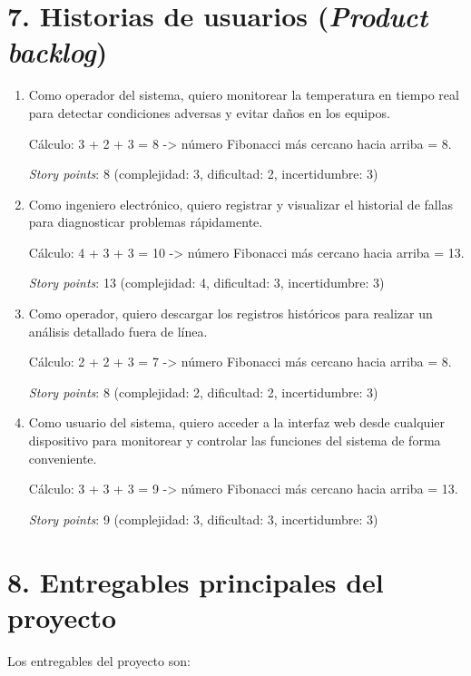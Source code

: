 \documentclass[
11pt, %
]{charter}
\begin{document}
\section{7. Historias de usuarios (\textit{Product backlog})}
\label{sec:backlog}

\begin{enumerate}
	\item Como operador del sistema, quiero monitorear la temperatura en tiempo real para detectar condiciones adversas y evitar daños en los equipos.
	
Cálculo: 3 + 2 + 3 = 8 -> número Fibonacci más cercano hacia arriba = 8. 
	
	\textit{Story points}: 8 (complejidad: 3, dificultad: 2, incertidumbre: 3)
	
	\item Como ingeniero electrónico, quiero registrar y visualizar el historial de fallas para diagnosticar problemas rápidamente.
	
Cálculo: 4 + 3 + 3 = 10 -> número Fibonacci más cercano hacia arriba = 13. 
	
	\textit{Story points}: 13 (complejidad: 4, dificultad: 3, incertidumbre: 3)
	
	\item Como operador, quiero descargar los registros históricos para realizar un análisis detallado fuera de línea.

Cálculo: 2 + 2 + 3 = 7 -> número Fibonacci más cercano hacia arriba = 8. 
	
	\textit{Story points}: 8 (complejidad: 2, dificultad: 2, incertidumbre: 3)
	
	\item Como usuario del sistema, quiero acceder a la interfaz web desde cualquier dispositivo para monitorear y controlar las funciones del sistema de forma conveniente.

Cálculo: 3 + 3 + 3 = 9 -> número Fibonacci más cercano hacia arriba = 13. 

	\textit{Story points}: 9 (complejidad: 3, dificultad: 3, incertidumbre: 3)
	
\end{enumerate}

\section{8. Entregables principales del proyecto}
\label{sec:entregables}

Los entregables del proyecto son:
\end{document}

